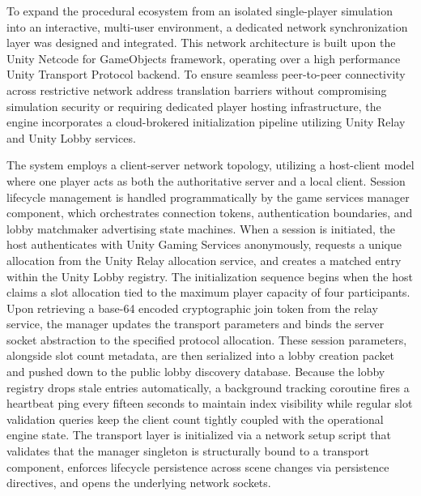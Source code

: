 \documentclass[12pt]{report}
\begin{document}
To expand the procedural ecosystem from an isolated single-player simulation into an interactive, multi-user environment, a dedicated network synchronization layer was designed and integrated. This network architecture is built upon the Unity Netcode for GameObjects framework, operating over a high performance Unity Transport Protocol backend. To ensure seamless peer-to-peer connectivity across restrictive network address translation barriers without compromising simulation security or requiring dedicated player hosting infrastructure, the engine incorporates a cloud-brokered initialization pipeline utilizing Unity Relay and Unity Lobby services.

The system employs a client-server network topology, utilizing a host-client model where one player acts as both the authoritative server and a local client. Session lifecycle management is handled programmatically by the game services manager component, which orchestrates connection tokens, authentication boundaries, and lobby matchmaker advertising state machines. When a session is initiated, the host authenticates with Unity Gaming Services anonymously, requests a unique allocation from the Unity Relay allocation service, and creates a matched entry within the Unity Lobby registry. The initialization sequence begins when the host claims a slot allocation tied to the maximum player capacity of four participants. Upon retrieving a base-64 encoded cryptographic join token from the relay service, the manager updates the transport parameters and binds the server socket abstraction to the specified protocol allocation. These session parameters, alongside slot count metadata, are then serialized into a lobby creation packet and pushed down to the public lobby discovery database. Because the lobby registry drops stale entries automatically, a background tracking coroutine fires a heartbeat ping every fifteen seconds to maintain index visibility while regular slot validation queries keep the client count tightly coupled with the operational engine state. The transport layer is initialized via a network setup script that validates that the manager singleton is structurally bound to a transport component, enforces lifecycle persistence across scene changes via persistence directives, and opens the underlying network sockets.
\end{document}
